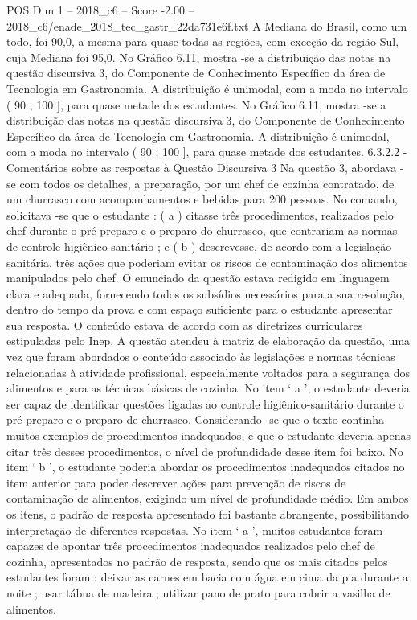 \begin{textsample}{POS Dim 1 – 2018\_c6 – Score -2.00 – 2018\_c6/enade\_2018\_tec\_gastr\_22da731e6f.txt}
A Mediana do Brasil, como um todo, foi 90,0, a mesma para quase todas as regiões, com exceção da região Sul, cuja Mediana foi 95,0.
No Gráfico 6.11, mostra -se a distribuição das notas na questão discursiva 3, do Componente de Conhecimento Específico da área de Tecnologia em Gastronomia.
A distribuição é unimodal, com a moda no intervalo ( 90 ; 100 ], para quase metade dos estudantes.
No Gráfico 6.11, mostra -se a distribuição das notas na questão discursiva 3, do Componente de Conhecimento Específico da área de Tecnologia em Gastronomia.
A distribuição é unimodal, com a moda no intervalo ( 90 ; 100 ], para quase metade dos estudantes. 6.3.2.2 - Comentários sobre as respostas à Questão Discursiva 3 Na questão 3, abordava -se com todos os detalhes, a preparação, por um chef de cozinha contratado, de um churrasco com acompanhamentos e bebidas para 200 pessoas.
No comando, solicitava -se que o estudante : ( a ) citasse três procedimentos, realizados pelo chef durante o pré-preparo e o preparo do churrasco, que contrariam as normas de controle higiênico-sanitário ; e ( b ) descrevesse, de acordo com a legislação sanitária, três ações que poderiam evitar os riscos de contaminação dos alimentos manipulados pelo chef.
O enunciado da questão estava redigido em linguagem clara e adequada, fornecendo todos os subsídios necessários para a sua resolução, dentro do tempo da prova e com espaço suficiente para o estudante apresentar sua resposta.
O conteúdo estava de acordo com as diretrizes curriculares estipuladas pelo Inep.
A questão atendeu à matriz de elaboração da questão, uma vez que foram abordados o conteúdo associado às legislações e normas técnicas relacionadas à atividade profissional, especialmente voltados para a segurança dos alimentos e para as técnicas básicas de cozinha.
No item ‘ a ’, o estudante deveria ser capaz de identificar questões ligadas ao controle higiênico-sanitário durante o pré-preparo e o preparo de churrasco.
Considerando -se que o texto continha muitos exemplos de procedimentos inadequados, e que o estudante deveria apenas citar três desses procedimentos, o nível de profundidade desse item foi baixo.
No item ‘ b ’, o estudante poderia abordar os procedimentos inadequados citados no item anterior para poder descrever ações para prevenção de riscos de contaminação de alimentos, exigindo um nível de profundidade médio.
Em ambos os itens, o padrão de resposta apresentado foi bastante abrangente, possibilitando interpretação de diferentes respostas.
No item ‘ a ’, muitos estudantes foram capazes de apontar três procedimentos inadequados realizados pelo chef de cozinha, apresentados no padrão de resposta, sendo que os mais citados pelos estudantes foram : deixar as carnes em bacia com água em cima da pia durante a noite ; usar tábua de madeira ; utilizar pano de prato para cobrir a vasilha de alimentos.

\end{textsample}
